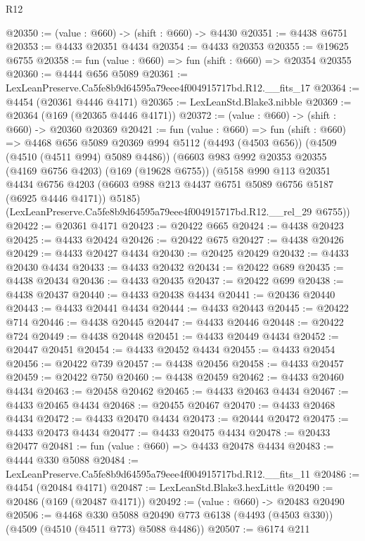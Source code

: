 \begin{lexlean}{R12}
\begin{coremodule}
@20350 := (value : @660) -> (shift : @660) -> @4430
@20351 := @4438 @6751
@20353 := @4433 @20351 @4434
@20354 := @4433 @20353
@20355 := @19625 @6755
@20358 := fun (value : @660) => fun (shift : @660) => @20354 @20355
@20360 := @4444 @656 @5089
@20361 := LexLeanPreserve.Ca5fe8b9d64595a79eee4f004915717bd.R12.__fits_17
@20364 := @4454 (@20361 @4446 @4171)
@20365 := LexLeanStd.Blake3.nibble
@20369 := @20364 (@169 (@20365 @4446 @4171))
@20372 := (value : @660) -> (shift : @660) -> @20360 @20369
@20421 := fun (value : @660) =>
  fun (shift : @660) =>
  @4468
    @656
    @5089
    @20369
    @994
    @5112
    (@4493 (@4503 @656))
    (@4509 (@4510 (@4511 @994) @5089 @4486))
    (@6603
      @983
      @992
      @20353
      @20355
      (@4169 @6756 @4203)
      (@169 (@19628 @6755))
      (@5158
        @990
        @113
        @20351
        @4434
        @6756
        @4203
        (@6603 @988 @213 @4437 @6751 @5089 @6756 @5187 (@6925 @4446 @4171))
        @5185)
      (LexLeanPreserve.Ca5fe8b9d64595a79eee4f004915717bd.R12.__rel_29 @6755))
@20422 := @20361 @4171
@20423 := @20422 @665
@20424 := @4438 @20423
@20425 := @4433 @20424
@20426 := @20422 @675
@20427 := @4438 @20426
@20429 := @4433 @20427 @4434
@20430 := @20425 @20429
@20432 := @4433 @20430 @4434
@20433 := @4433 @20432
@20434 := @20422 @689
@20435 := @4438 @20434
@20436 := @4433 @20435
@20437 := @20422 @699
@20438 := @4438 @20437
@20440 := @4433 @20438 @4434
@20441 := @20436 @20440
@20443 := @4433 @20441 @4434
@20444 := @4433 @20443
@20445 := @20422 @714
@20446 := @4438 @20445
@20447 := @4433 @20446
@20448 := @20422 @724
@20449 := @4438 @20448
@20451 := @4433 @20449 @4434
@20452 := @20447 @20451
@20454 := @4433 @20452 @4434
@20455 := @4433 @20454
@20456 := @20422 @739
@20457 := @4438 @20456
@20458 := @4433 @20457
@20459 := @20422 @750
@20460 := @4438 @20459
@20462 := @4433 @20460 @4434
@20463 := @20458 @20462
@20465 := @4433 @20463 @4434
@20467 := @4433 @20465 @4434
@20468 := @20455 @20467
@20470 := @4433 @20468 @4434
@20472 := @4433 @20470 @4434
@20473 := @20444 @20472
@20475 := @4433 @20473 @4434
@20477 := @4433 @20475 @4434
@20478 := @20433 @20477
@20481 := fun (value : @660) => @4433 @20478 @4434
@20483 := @4444 @330 @5088
@20484 := LexLeanPreserve.Ca5fe8b9d64595a79eee4f004915717bd.R12.__fits_11
@20486 := @4454 (@20484 @4171)
@20487 := LexLeanStd.Blake3.hexLittle
@20490 := @20486 (@169 (@20487 @4171))
@20492 := (value : @660) -> @20483 @20490
@20506 := @4468
    @330
    @5088
    @20490
    @773
    @6138
    (@4493 (@4503 @330))
    (@4509 (@4510 (@4511 @773) @5088 @4486))
@20507 := @6174 @211

\end{coremodule}
\end{lexlean}
